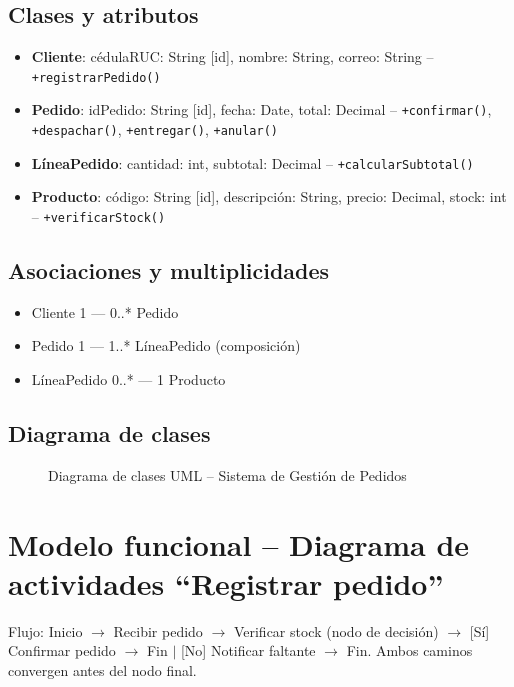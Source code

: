 \documentclass[11pt,a4paper]{article}
\begin{document}
\subsection*{Clases y atributos}
\begin{itemize}
    \item \textbf{Cliente}: cédulaRUC: String [id], nombre: String, correo: String -- \texttt{+registrarPedido()}
    \item \textbf{Pedido}: idPedido: String [id], fecha: Date, total: Decimal -- \texttt{+confirmar()}, \texttt{+despachar()}, \texttt{+entregar()}, \texttt{+anular()}
    \item \textbf{LíneaPedido}: cantidad: int, subtotal: Decimal -- \texttt{+calcularSubtotal()}
    \item \textbf{Producto}: código: String [id], descripción: String, precio: Decimal, stock: int -- \texttt{+verificarStock()}
\end{itemize}

\subsection*{Asociaciones y multiplicidades}
\begin{itemize}
    \item Cliente 1 --- 0..* Pedido
    \item Pedido 1 --- 1..* LíneaPedido (composición)
    \item LíneaPedido 0..* --- 1 Producto
\end{itemize}

\subsection*{Diagrama de clases}
\begin{figure}[h!]
    \centering
    \resizebox{0.95\textwidth}{!}{}
    \caption{Diagrama de clases UML -- Sistema de Gestión de Pedidos}
    \label{fig:class}
\end{figure}

\newpage

\section{Modelo funcional -- Diagrama de actividades ``Registrar pedido''}

Flujo: Inicio $\rightarrow$ Recibir pedido $\rightarrow$ Verificar stock (nodo de decisión) $\rightarrow$
[Sí] Confirmar pedido $\rightarrow$ Fin $\mid$ [No] Notificar faltante $\rightarrow$ Fin.
Ambos caminos convergen antes del nodo final.
\end{document}
